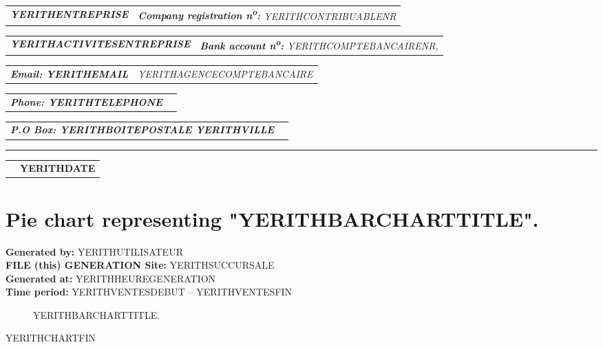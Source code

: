\documentclass[11pt,YERITHPAPERSPEC]{article} %
\makeatletter
\newcommand{\headerrow}[2]
{\begin{tabular*}{\linewidth}{l@{\extracolsep{\fill}}r}
	#1 &
	#2 \\
\end{tabular*}}
\newcommand{\emphbold}[1]{\textbf{\emph{#1}}\xspace}
\makeatother
\begin{document}
\bigskip

\headerrow
	{\emphbold{YERITHENTREPRISE}}
	{\emph{\textbf{Company registration n\textsuperscript{o}:} YERITHCONTRIBUABLENR}}
\headerrow
	{\emphbold{YERITHACTIVITESENTREPRISE}}
	{\emph{\textbf{Bank account n\textsuperscript{o}:} YERITHCOMPTEBANCAIRENR,}}
\headerrow
	{\emphbold{Email: YERITHEMAIL}}
	{\emph{YERITHAGENCECOMPTEBANCAIRE}}
\headerrow
	{\emphbold{Phone: YERITHTELEPHONE}}
	{}
\headerrow
	{\emphbold{P.O Box: YERITHBOITEPOSTALE YERITHVILLE}}
	{}
	
\hrule

\headerrow
	{}
	{\textbf{YERITHDATE}}

\section*{Pie chart representing "YERITHBARCHARTTITLE".}
\textbf{Generated by:} YERITHUTILISATEUR\\
\textbf{FILE (this) GENERATION Site:} YERITHSUCCURSALE\\
\textbf{Generated at:} YERITHHEUREGENERATION\\
\textbf{Time period:} YERITHVENTESDEBUT -- YERITHVENTESFIN

\begin{figure}[!htbp]
\centering
{}
\caption{YERITHBARCHARTTITLE.}
\end{figure}

YERITHCHARTFIN\\
\end{document}
